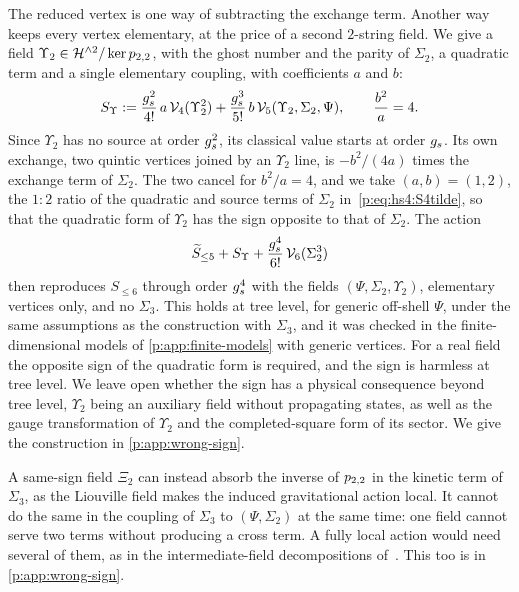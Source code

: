 The reduced vertex is one way of subtracting the exchange term.
  Another way keeps every vertex elementary, at the price of a second $2$-string field.
  We give a field $\Upsilon_2 \in \Hn{2} / \ker \sprod{2}{2}$, with the ghost number and the parity of $\Sigma_2$, a quadratic term and a single elementary coupling, with coefficients $a$ and $b$:
  \begin{equation}
  \label{p:eq:hs6:partner}
  S_\Upsilon
    := \frac{\gs^2}{4!} \, a \, \vertex{4}(\Upsilon_2^2)
      + \frac{\gs^3}{5!} \, b \, \vertex{5}(\Upsilon_2, \Sigma_2, \Psi),
  \qquad
  \frac{b^2}{a}
    = 4.
\end{equation}
  Since $\Upsilon_2$ has no source at order $\gs^2$, its classical value starts at order $\gs$.
  Its own exchange, two quintic vertices joined by an $\Upsilon_2$ line, is $- b^2 / (4 a)$ times the exchange term of $\Sigma_2$.
  The two cancel for $b^2 / a = 4$, and we take $(a, b) = (1, 2)$, the $1 : 2$ ratio of the quadratic and source terms of $\Sigma_2$ in~\eqref{p:eq:hs4:S4tilde}, so that the quadratic form of $\Upsilon_2$ has the sign opposite to that of $\Sigma_2$.
  The action
  \begin{equation}
  \caction[\le 5] + S_\Upsilon + \frac{\gs^4}{6!} \, \vertex{6}(\Sigma_2^3)
\end{equation}
  then reproduces $S_{\le 6}$ through order $\gs^4$ with the fields $(\Psi, \Sigma_2, \Upsilon_2)$, elementary vertices only, and no $\Sigma_3$.
  This holds at tree level, for generic off-shell $\Psi$, under the same assumptions as the construction with $\Sigma_3$, and it was checked in the finite-dimensional models of \cref{p:app:finite-models} with generic vertices.
  For a real field the opposite sign of the quadratic form is required, and the sign is harmless at tree level.
  We leave open whether the sign has a physical consequence beyond tree level, $\Upsilon_2$ being an auxiliary field without propagating states, as well as the gauge transformation of $\Upsilon_2$ and the completed-square form of its sector.
  We give the construction in \cref{p:app:wrong-sign}.

A same-sign field $\Xi_2$ can instead absorb the inverse of $\sprod{2}{2}$ in the kinetic term of $\Sigma_3$, as the Liouville field makes the induced gravitational action local.
It cannot do the same in the coupling of $\Sigma_3$ to $(\Psi, \Sigma_2)$ at the same time: one field cannot serve two terms without producing a cross term.
A fully local action would need several of them, as in the intermediate-field decompositions of~\cite{Rivasseau:2010:LoopVertexExpansion,Lionni:2018:NoteIntermediateField}.
This too is in \cref{p:app:wrong-sign}.
